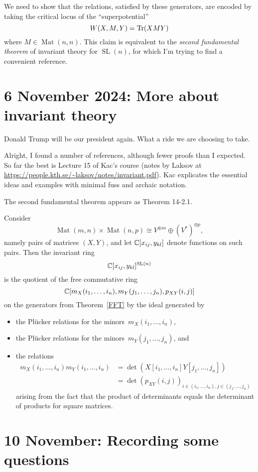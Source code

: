 \documentclass[11pt]{amsart}
\DeclareMathOperator{\SL}{SL}
\DeclareMathOperator{\Mat}{Mat}
\begin{document}
We need to show that the relations, satisfied by these generators, are encoded by taking the critical locus of the ``superpotential''
\[
W(X,M,Y) = \operatorname{Tr}(XMY)
\]
where $M \in \Mat(n,n)$.
This claim is equivalent to the {\em second fundamental theorem} of invariant theory for $\SL(n)$,
for which I'm trying to find a convenient reference.

\section{6 November 2024: More about invariant theory}

Donald Trump will be our president again.
What a ride we are choosing to take.

Alright, I found a number of references, although fewer proofs than I expected.
So far the best is Lecture 15 of Kac's course (notes by Laksov at \url{https://people.kth.se/~laksov/notes/invariant.pdf}).
Kac explicates the essential ideas and examples with minimal fuss and archaic notation.

The second fundamental theorem appears as Theorem 14-2.1.

\begin{thm}[SFT for $\SL(n)$]
Consider 
\[
\Mat(m,n) \times \Mat(n,p)\cong V^{\oplus m} \oplus (V^*)^{\oplus p},
\]
namely pairs of matrices $(X,Y)$, and let $\mathbb C[x_{ij}, y_{kl}]$ denote functions on such pairs.
Then the invariant ring
\[
\CC[x_{ij}, y_{kl}]^{\SL(n)}
\]
is the quotient of the free commutative ring 
\[
\mathbb C[m_X(i_1,\ldots, i_n), m_Y(j_1,\ldots, j_n), p_{XY}(i,j)]
\]
on the generators from Theorem~\ref{FFT}
by the ideal generated by
\begin{itemize}
\item the Pl\"ucker relations for the minors~$m_X(i_1,\ldots, i_n)$,
\item the Pl\"ucker relations for the minors~$m_Y(j_1,\ldots, j_n)$, and
\item the relations
\begin{align*}
m_X(i_1,\ldots, i_n)m_Y(i_1,\ldots, i_n) 
&= \det(X[i_1,\ldots,i_n]Y[j_1,\ldots,j_n]) \\
&= \det(p_{XY}(i,j))_{i \in (i_1,\ldots, i_n), j \in (j_1,\ldots, j_n)}
\end{align*}
arising from the fact that the product of determinants equals the determinant of products for square matrices.
\end{itemize}
\end{thm}

\section{10 November: Recording some questions}
\end{document}
